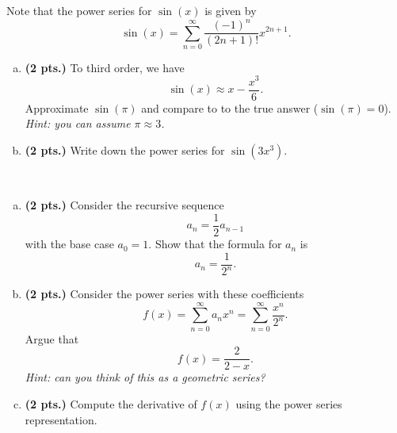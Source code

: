 \begin{problem}
Note that the power series for $\sin(x)$ is given by
\[
\sin(x) = \sum_{n=0}^\infty \frac{(-1)^{n}}{(2n+1)!}x^{2n+1}.
\]
\begin{enumerate}[(a)]
\item \textbf{(2 pts.)} To third order, we have
\[
\sin(x) \approx x -\frac{x^3}{6}.
\]
Approximate $\sin(\pi)$ and compare to to the true answer ($\sin(\pi)=0$). \emph{Hint: you can assume $\pi \approx 3$.}
\item \textbf{(2 pts.)} Write down the power series for $\sin(3x^3)$.
\end{enumerate}
\end{problem}

\vspace*{0.5cm}


\begin{problem}~
\begin{enumerate}[(a)]
\item \textbf{(2 pts.)} Consider the recursive sequence
\[
a_{n} = \frac{1}{2} a_{n-1}
\]
with the base case $a_0=1$. Show that the formula for $a_n$ is
\[
a_n = \frac{1}{2^n}.
\]
\item \textbf{(2 pts.)} Consider the power series with these coefficients
\[
f(x)=\sum_{n=0}^\infty a_n x^n = \sum_{n=0}^\infty \frac{x^n}{2^n}.
\]
Argue that
\[
f(x)=\frac{2}{2-x}.
\]
\emph{Hint: can you think of this as a geometric series?}
\item \textbf{(2 pts.)} Compute the derivative of $f(x)$ using the power series representation.
\end{enumerate}
\end{problem}

